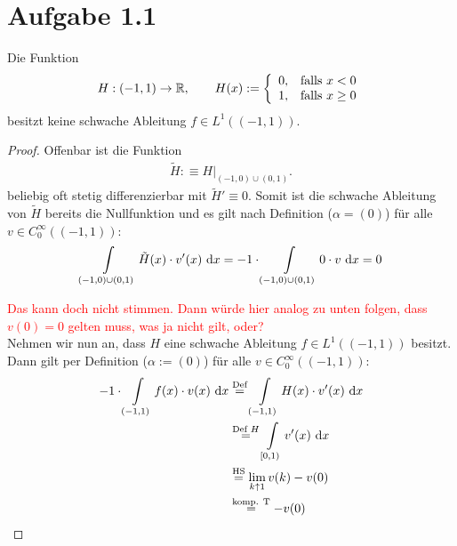 \documentclass[12pt,a4paper]{article}
\author{Willi Sontopski}
\begin{document}

\section*{Aufgabe 1.1}
Die Funktion
\begin{align*}
H:(-1,1)\to\mathbb{R},\qquad H(x):=\left\lbrace\begin{array}{cl}
0, & \text{falls } x<0\\
1, & \text{falls } x\geq0
\end{array}\right.
\end{align*}
besitzt keine schwache Ableitung $f\in L^1((-1,1))$.
\begin{proof}
Offenbar ist die Funktion
\begin{align*}
\tilde{H}:\equiv H|_{(-1,0)\cup(0,1)}.
\end{align*}
beliebig oft stetig differenzierbar mit $\tilde{H}'\equiv0$. Somit ist die schwache Ableitung von $\tilde{H}$ bereits die Nullfunktion und es gilt nach Definition ($\alpha=(0)$) für alle $v\in C_0^\infty((-1,1))$:
\begin{align*}
\int\limits_{(-1,0)\cup(0,1)}\tilde{H}(x)\cdot v'(x)\text{ d} x=-1\cdot\int\limits_{(-1,0)\cup(0,1)} 0\cdot v\text{ d} x=0
\end{align*}

\textcolor{red}{Das kann doch nicht stimmen. Dann würde hier analog zu unten folgen, dass $v(0)=0$ gelten muss, was ja nicht gilt, oder?}\\

Nehmen wir nun an, dass $H$ eine schwache Ableitung $f\in L^1((-1,1))$ besitzt. Dann gilt per Definition ($\alpha:=(0)$) für alle $v\in C_0^\infty((-1,1))$:
\begin{align*}
-1\cdot\int\limits_{(-1,1)} f(x)\cdot v(x)\text{ d} x
&\stackrel{\text{Def}}{=}
\int\limits_{(-1,1)} H(x)\cdot v'(x)\text{ d} x\\
&\stackrel{\text{Def }H}{=}
\int\limits_{[0,1)} v'(x)\text{ d} x\\
&\stackrel{\text{HS}}{=}
\lim\limits_{k\uparrow 1} v(k)-v(0)\\
&\stackrel{\text{komp. T}}{=}
-v(0)
\end{align*}
\end{proof}
\end{document}
